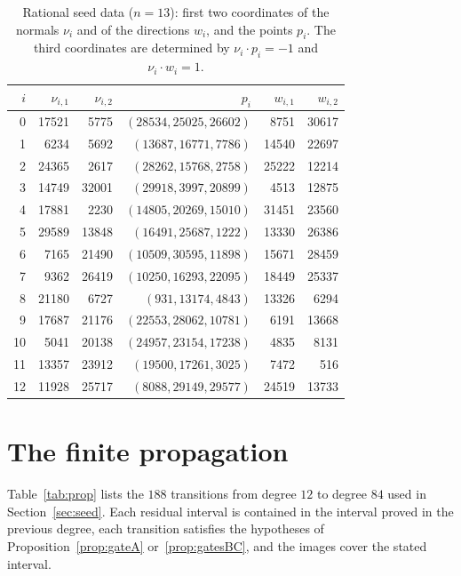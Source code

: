 \documentclass{amsart}
\theoremstyle{definition}
\theoremstyle{remark}
\numberwithin{equation}{section}
\begin{document}
\begin{table}[H]\small
\caption{Rational seed data ($n=13$): first two coordinates of the normals $\nu_i$ and of the directions $w_i$, and the points $p_i$. The third coordinates are determined by $\nu_i\cdot p_i=-1$ and $\nu_i\cdot w_i=1$.}\label{tab:seed}
\begin{tabular}{rrrrrr}\toprule $i$&$\nu_{i,1}$&$\nu_{i,2}$&$p_i$&$w_{i,1}$&$w_{i,2}$\\\midrule
0&17521&5775&$(28534,25025,26602)$&8751&30617\\
1&6234&5692&$(13687,16771,7786)$&14540&22697\\
2&24365&2617&$(28262,15768,2758)$&25222&12214\\
3&14749&32001&$(29918,3997,20899)$&4513&12875\\
4&17881&2230&$(14805,20269,15010)$&31451&23560\\
5&29589&13848&$(16491,25687,1222)$&13330&26386\\
6&7165&21490&$(10509,30595,11898)$&15671&28459\\
7&9362&26419&$(10250,16293,22095)$&18449&25337\\
8&21180&6727&$(931,13174,4843)$&13326&6294\\
9&17687&21176&$(22553,28062,10781)$&6191&13668\\
10&5041&20138&$(24957,23154,17238)$&4835&8131\\
11&13357&23912&$(19500,17261,3025)$&7472&516\\
12&11928&25717&$(8088,29149,29577)$&24519&13733\\
\bottomrule\end{tabular}\end{table}

\section{The finite propagation}\label{app:propagation}

Table~\ref{tab:prop} lists the $188$ transitions from degree $12$ to degree $84$ used in
Section~\ref{sec:seed}. Each residual interval is contained in the interval proved in the
previous degree, each transition satisfies the hypotheses of
Proposition~\ref{prop:gateA} or~\ref{prop:gatesBC}, and the images cover the stated
interval.
\end{document}
